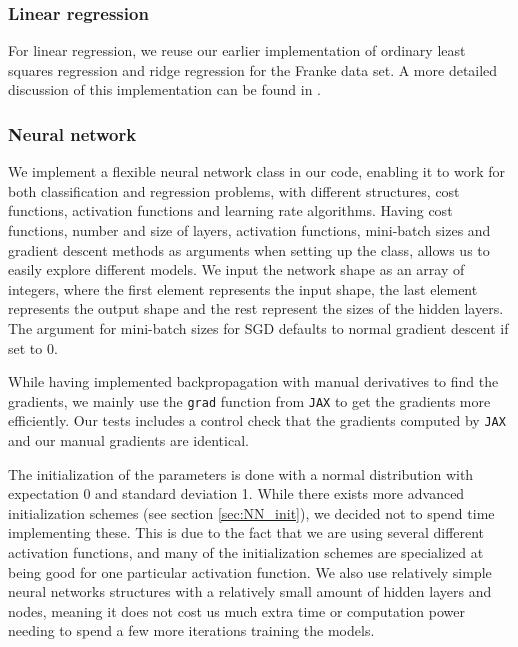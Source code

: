 \subsubsection{Linear regression}

For linear regression, we reuse our earlier implementation of ordinary least squares regression and ridge regression for the Franke data set. A more detailed discussion of this implementation can be found in \textcite{project1}.

\subsubsection{Neural network}\label{sec:nn_imp}

We implement a flexible neural network class in our code, enabling it to work for both classification and regression problems, with different structures, cost functions, activation functions and learning rate algorithms.
Having cost functions, number and size of layers, activation functions, mini-batch sizes and gradient descent methods as arguments when setting up the class, allows us to easily explore different models.
We input the network shape as an array of integers, where the first element represents the input shape, the last element represents the output shape and the rest represent the sizes of the hidden layers.
The argument for mini-batch sizes for SGD defaults to normal gradient descent if set to 0.

While having implemented backpropagation with manual derivatives to find the gradients, we mainly use the \texttt{grad} function from \texttt{JAX} \cite{jax2018github} to get the gradients more efficiently.
Our tests includes a control check that the gradients computed by \texttt{JAX} and our manual gradients are identical.

The initialization of the parameters is done with a normal distribution with expectation 0 and standard deviation 1.
While there exists more advanced initialization schemes (see section \ref{sec:NN_init}), we decided not to spend time implementing these.
This is due to the fact that we are using several different activation functions, and many of the initialization schemes are specialized at being good for one particular activation function.
We also use relatively simple neural networks structures with a relatively small amount of hidden layers and nodes, meaning it does not cost us much extra time or computation power needing to spend a few more iterations training the models.

